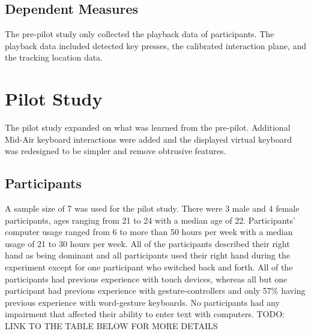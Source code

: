 \begin{table}[h]
	\centering
	\caption[Schedule of Assessments]{\centering Schedule of Assessments for a single study visit (in minutes).}
	\label{pre_schedule_of_assessments}
\end{table}
	
\subsection{Dependent Measures}

The pre-pilot study only collected the playback data of participants. The playback data included detected key presses, the calibrated interaction plane, and the tracking location data.

\section{Pilot Study} \label{pilot}

The pilot study expanded on what was learned from the pre-pilot. Additional Mid-Air keyboard interactions were added and the displayed virtual keyboard was redesigned to be simpler and remove obtrusive features.

\subsection{Participants} \label{pilot_participants}

A sample size of 7 was used for the pilot study. There were 3 male and 4 female participants, ages ranging from 21 to 24 with a median age of 22. Participants' computer usage ranged from 6 to more than 50 hours per week with a median usage of 21 to 30 hours per week. All of the participants described their right hand as being dominant and all participants used their right hand during the experiment except for one participant who switched back and forth. All of the participants had previous experience with touch devices, whereas all but one participant had previous experience with gesture-controllers and only 57\% having previous experience with word-gesture keyboards. No participants had any impairment that affected their ability to enter text with computers. TODO: LINK TO THE TABLE BELOW FOR MORE DETAILS

